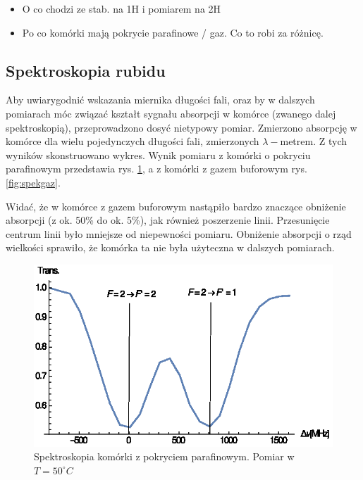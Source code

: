 \documentclass[a4paper,10pt]{article}
\begin{document}
\begin{itemize}
 \item O co chodzi ze stab. na 1H i pomiarem na 2H
 \item Po co komórki mają pokrycie parafinowe / gaz. Co to robi za różnicę.
\end{itemize}



\subsection{Spektroskopia rubidu}

Aby uwiarygodnić wskazania miernika długości fali, oraz by w dalszych pomiarach móc związać kształt sygnału absorpcji w komórce (zwanego dalej spektroskopią), przeprowadzono dosyć nietypowy pomiar.
Zmierzono absorpcję w komórce dla wielu pojedynczych długości fali, zmierzonych $\lambda-$metrem. Z tych wyników skonstruowano wykres.
Wynik pomiaru z komórki o pokryciu parafinowym przedstawia rys. \ref{fig:spekpara}, a z komórki z gazem buforowym rys. \ref{fig:spekgaz}.

Widać, że w komórce z gazem buforowym nastąpiło bardzo znaczące obniżenie absorpcji (z ok. 50\% do ok. 5\%), jak również poszerzenie linii. Przesunięcie centrum linii było mniejsze od niepewności pomiaru. Obniżenie absorpcji o rząd wielkości sprawiło, że komórka ta nie była użyteczna w dalszych pomiarach.


\begin{figure}[h!]
\centering
 \includegraphics[width=\textwidth]{spek_para.eps}
 \caption{Spektroskopia komórki z pokryciem parafinowym. Pomiar w $T=50^{\circ}C$}
 \label{fig:spekpara}
\end{figure}
\end{document}
